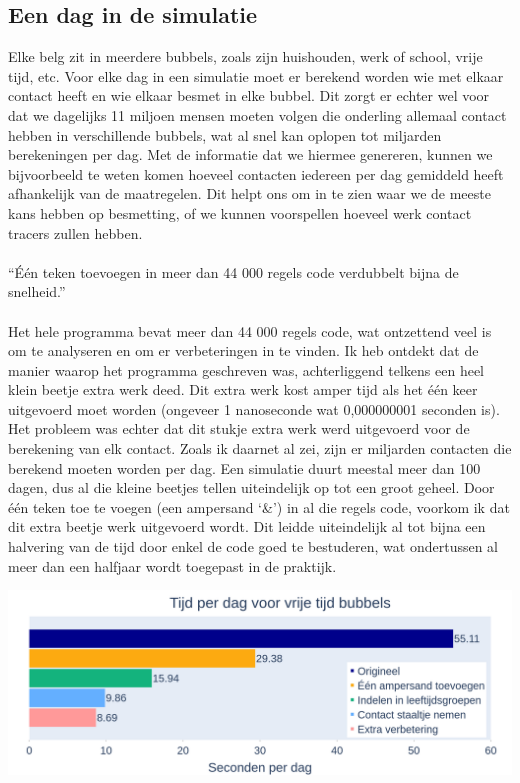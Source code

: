 \documentclass[10pt]{article} %
\begin{document}
\subsection*{Een dag in de simulatie}
Elke belg zit in meerdere bubbels, zoals zijn huishouden, werk of school, vrije tijd, etc. Voor elke dag in een simulatie moet er berekend worden wie met elkaar contact heeft en wie elkaar besmet in elke bubbel. Dit zorgt er echter wel voor dat we dagelijks 11 miljoen mensen moeten volgen die onderling allemaal contact hebben in verschillende bubbels, wat al snel kan oplopen tot miljarden berekeningen per dag. Met de informatie dat we hiermee genereren, kunnen we bijvoorbeeld te weten komen hoeveel contacten iedereen per dag gemiddeld heeft afhankelijk van de maatregelen. Dit helpt ons om in te zien waar we de meeste kans hebben op besmetting, of we kunnen voorspellen hoeveel werk contact tracers zullen hebben.
\\\\
{\Large``Één teken toevoegen in meer dan 44 000 regels code verdubbelt bijna de snelheid.''}
\\\\
Het hele programma bevat meer dan 44 000 regels code, wat ontzettend veel is om te analyseren en om er verbeteringen in te vinden. Ik heb ontdekt dat de manier waarop het programma geschreven was, achterliggend telkens een heel klein beetje extra werk deed. Dit extra werk kost amper tijd als het één keer uitgevoerd moet worden (ongeveer 1 nanoseconde wat 0,000000001 seconden is). Het probleem was echter dat dit stukje extra werk werd uitgevoerd voor de berekening van elk contact. Zoals ik daarnet al zei, zijn er miljarden contacten die berekend moeten worden per dag. Een simulatie duurt meestal meer dan 100 dagen, dus al die kleine beetjes tellen uiteindelijk op tot een groot geheel. Door één teken toe te voegen (een ampersand `\&') in al die regels code, voorkom ik dat dit extra beetje werk uitgevoerd wordt. Dit leidde uiteindelijk al tot bijna een halvering van de tijd door enkel de code goed te bestuderen, wat ondertussen al meer dan een halfjaar wordt toegepast in de praktijk.

\includegraphics[width=\linewidth]{snelheidswinst.png}
\end{document}
